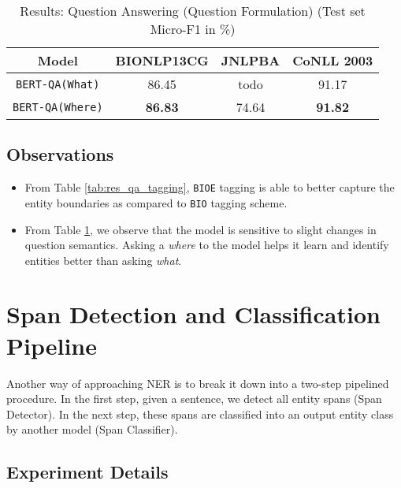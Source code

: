 \begin{table}[h!]
\centering
\begin{tabular}{|c|c|c|c|}\hline
	\textbf{Model} & \textbf{BIONLP13CG} & \textbf{JNLPBA} & \textbf{CoNLL 2003}\\\hline
	\texttt{BERT-QA(What)} & 86.45 & todo & 91.17\\\hline
	\texttt{BERT-QA(Where)} & \textbf{86.83} & 74.64 & \textbf{91.82}\\\hline
	\end{tabular}
    \caption{Results: Question Answering (Question Formulation) (Test set Micro-F1 in \%)}
    \label{tab:res_qa_question}
\end{table}

\subsection{Observations}
\begin{itemize}
    \item From Table \ref{tab:res_qa_tagging}, \texttt{BIOE} tagging is able to better capture the entity boundaries as compared to \texttt{BIO} tagging scheme.
    
    \item From Table \ref{tab:res_qa_question}, we observe that the model is sensitive to slight changes in question semantics. Asking a \textit{where} to the model helps it learn and identify entities better than asking \textit{what}. 
\end{itemize}

\section{Span Detection and Classification Pipeline}
Another way of approaching NER is to break it down into a two-step pipelined procedure. In the first step, given a sentence, we detect all entity spans (Span Detector). In the next step, these spans are classified into an output entity class by another model (Span Classifier).

\subsection{Experiment Details}

